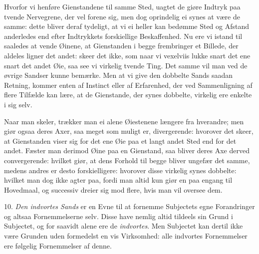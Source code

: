 \documentclass[12pt,a4paper]{article}
\newcommand{\opage}[1]{\marginnote{\footnotesize\textit{[#1]}}}
\begin{document}
Hvorfor vi henføre Gienstandene til samme Sted, uagtet de giøre Indtryk paa tvende
Nervegrene, der vel forene sig, men dog oprindelig ei synes at være de samme: dette
bliver deraf tydeligt, at vi ei heller kan bedømme Sted og Afstand anderledes end efter
Indtrykkets
\opage{75} forskiellige Beskaffenhed. Nu ere vi istand til saaledes at vende Øinene, at
Gienstanden i begge frembringer et Billede, der aldeles ligner det andet: skeer det
ikke, som naar vi vexelviis lukke snart det ene snart det andet Øie, saa see vi
virkelig tvende Ting. Det samme vil man ved de øvrige Sandser kunne bemærke. Men at vi
give den dobbelte Sands saadan Retning, kommer enten af Instinct eller af Erfarenhed,
der ved Sammenligning af flere Tilfælde kan lære, at de Gienstande, der synes dobbelte,
virkelig ere enkelte i sig selv.

Naar man skeler, trækker man ei alene Øiestenene længere fra hverandre; men giør ogsaa
deres Axer, saa meget som muligt er, divergerende: hvorover det skeer, at Gienstanden
viser sig for det ene Øie paa et langt andet Sted end for det andet. Fæster man derimod
Øine paa en Gienstand, saa bliver deres Axe derved convergerende: hvilket giør, at dens
Forhold til begge bliver ungefær det samme, medens andres er desto forskielligere:
hvorover disse virkelig synes dobbelte: hvilket man dog ikke agter paa, fordi man altid
kun giør en paa engang til Hovedmaal, og successiv dreier sig mod flere, hvis man vil
oversee dem.

10. \emph{Den indvortes Sands} er en Evne til at fornemme Subjectets egne Forandringer
og altsaa Fornemmelserne selv. Disse have nemlig altid tildeels sin Grund i Subjectet,
og for saavidt alene ere de \emph{indvortes}. Men Subjectet kan dertil ikke være
Grunden uden
\opage{76} formedelst en vis Virksomhed: alle indvortes Fornemmelser ere følgelig Fornemmelser af
denne.
\end{document}
